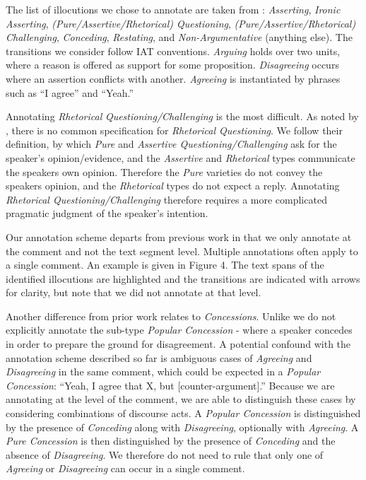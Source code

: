\documentclass[11pt,a4paper]{article}
\begin{document}
The list of illocutions we chose to annotate are taken from \citeauthor{BudzynskaJRS16} : \textit{Asserting}, \textit{Ironic Asserting}, \textit{(Pure/Assertive/Rhetorical) Questioning}, \textit{(Pure/Assertive/Rhetorical) Challenging}, \textit{Conceding}, \textit{Restating}, and \textit{Non-Argumentative} (anything else). The transitions we consider follow IAT conventions. \textit{Arguing} holds over two units, where a reason is offered as support for some proposition. \textit{Disagreeing} occurs where an assertion conflicts with another. \textit{Agreeing} is instantiated by phrases such as ``I agree'' and ``Yeah.''

Annotating \textit{Rhetorical}  \textit{Questioning/Challenging} is the most difficult. As noted by  \citeauthor{BudzynskaJRS16} , there is no common specification for \textit{Rhetorical Questioning}. We follow their definition, by which \textit{Pure} and \textit{Assertive Questioning/Challenging} ask for the speaker's opinion/evidence, and the \textit{Assertive} and \textit{Rhetorical} types communicate the speakers own opinion. Therefore the \textit{Pure} varieties do not convey the speakers opinion, and the \textit{Rhetorical} types do not expect a reply. Annotating \textit{Rhetorical Questioning/Challenging} therefore requires a more complicated pragmatic judgment of the speaker's intention.

Our annotation scheme departs from previous work in that we only annotate at the comment and not the text segment level. Multiple annotations often apply to a single comment. An example is given in Figure 4. The text spans of the identified illocutions are highlighted and the transitions are indicated with arrows for clarity, but note that we did not annotate at that level.

Another difference from prior work relates to \textit{Concessions}. Unlike \citeauthor{BudzynskaJRS16}  we do not explicitly annotate the sub-type \textit{Popular Concession} - where a speaker concedes in order to prepare the ground for disagreement. A potential confound with the annotation scheme described so far is ambiguous cases of \textit{Agreeing} and \textit{Disagreeing} in the same comment, which could be expected in a \textit{Popular Concession}: ``Yeah, I agree that X, but [counter-argument].'' Because we are annotating at the level of the comment, we are able to distinguish these cases by considering combinations of discourse acts. A \textit{Popular Concession} is distinguished by the presence of \textit{Conceding} along with \textit{Disagreeing}, optionally with \textit{Agreeing}. A \textit{Pure Concession} is then distinguished by the presence of \textit{Conceding} and the absence of \textit{Disagreeing}. We therefore do not need to rule that only one of \textit{Agreeing} or \textit{Disagreeing} can occur in a single comment.
\end{document}
